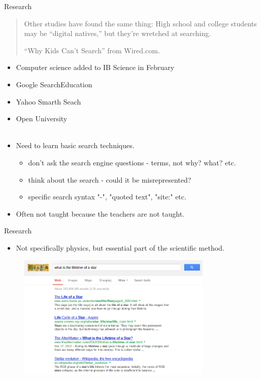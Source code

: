 \documentclass{beamer}
\begin{document}
\begin{frame}{Research}
    \begin{quote}
        Other studies have found the same thing: High school and college students may be ``digital natives,'' but they're wretched at searching.
        
        \hfill \tiny{``Why Kids Can't Search'' from Wired.com.}
    \end{quote}
    \pause
    \begin{itemize}[<+->]
        \item Computer science added to IB Science in February
        \item Google SearchEducation
        \item Yahoo Smarth Seach
        \item Open University
        \\~\\
        \item Need to learn basic search techniques.
        \begin{itemize}
            \item<1-> don't ask the search engine questions - terms, not why? what? etc.
            \item<1-> think about the search - could it be misrepresented?
            \item<1-> specific search syntax "-", "quoted text", "site:" etc.
        \end{itemize}
        \item Often not taught because the teachers are not taught.
    \end{itemize}
\end{frame}

\begin{frame}{Research}
    \begin{itemize}
        \item Not specifically physics, but essential part of the scientific method.
    \end{itemize} 
    \pause
    \begin{figure}
        \includegraphics[height=6cm]{google_search.png}
    \end{figure}
\end{frame}
\end{document}
